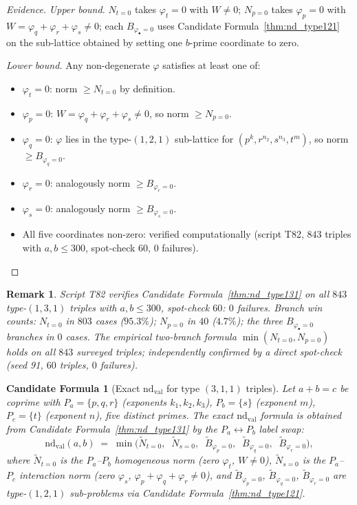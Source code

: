 \documentclass[12pt]{article}
\newtheorem{remark}{Remark}
\newtheorem{candidate}{Candidate Formula}
\theoremstyle{definition}
\begin{document}
\begin{proof}[Evidence]
  \textit{Upper bound.}  $N_{t=0}$ takes $\varphi_t=0$ with $W\ne 0$;
  $N_{p=0}$ takes $\varphi_p=0$ with $W=\varphi_q+\varphi_r+\varphi_s\ne 0$;
  each $B_{\varphi_\bullet=0}$ uses Candidate Formula~\ref{thm:nd_type121} on the sub-lattice
  obtained by setting one $b$-prime coordinate to zero.

  \textit{Lower bound.}
  Any non-degenerate $\varphi$ satisfies at least one of:
  \begin{itemize}
    \item $\varphi_t = 0$: norm $\ge N_{t=0}$ by definition.
    \item $\varphi_p = 0$: $W=\varphi_q+\varphi_r+\varphi_s\ne 0$,
      so norm $\ge N_{p=0}$.
    \item $\varphi_q = 0$: $\varphi$ lies in the type-$(1,2,1)$ sub-lattice for
      $(p^k, r^{n_2}, s^{n_3}, t^m)$, so norm $\ge B_{\varphi_q=0}$.
    \item $\varphi_r = 0$: analogously norm $\ge B_{\varphi_r=0}$.
    \item $\varphi_s = 0$: analogously norm $\ge B_{\varphi_s=0}$.
    \item All five coordinates non-zero: verified computationally (script T82,
      $843$ triples with $a, b \le 300$, spot-check $60$, $0$ failures).
  \end{itemize}
\end{proof}

\begin{remark}
  Script T82 verifies Candidate Formula~\ref{thm:nd_type131} on all $843$ type-$(1,3,1)$
  triples with $a, b \le 300$, spot-check $60$: $0$ failures.
  Branch win counts: $N_{t=0}$ in $803$ cases ($95.3\%$); $N_{p=0}$ in $40$
  ($4.7\%$); the three $B_{\varphi_\bullet=0}$ branches in $0$ cases.
  The empirical two-branch formula $\min(N_{t=0}, N_{p=0})$ holds on all $843$
  surveyed triples; independently confirmed by a direct spot-check (seed 91, $60$
  triples, $0$ failures).
\end{remark}

\begin{candidate}[Exact $\mathrm{nd}_{\mathrm{val}}$ for type $(3,1,1)$ triples]\label{cor:nd_type311}
  Let $a + b = c$ be coprime with $P_a = \{p, q, r\}$ (exponents $k_1, k_2, k_3$),
  $P_b = \{s\}$ (exponent $m$), $P_c = \{t\}$ (exponent $n$), five distinct primes.
  The exact $\mathrm{nd}_{\mathrm{val}}$ formula is obtained from Candidate Formula~\ref{thm:nd_type131} by
  the $P_a \leftrightarrow P_b$ label swap:
  \[
    \mathrm{nd}_{\mathrm{val}}(a,b) \;=\; \min\!\bigl(
      \tilde{N}_{t=0},\;\;
      \tilde{N}_{s=0},\;\;
      \tilde{B}_{\varphi_p=0},\;\;
      \tilde{B}_{\varphi_q=0},\;\;
      \tilde{B}_{\varphi_r=0}
    \bigr),
  \]
  where $\tilde{N}_{t=0}$ is the $P_a$--$P_b$ homogeneous norm (zero $\varphi_t$,
  $W\ne 0$), $\tilde{N}_{s=0}$ is the $P_a$--$P_c$ interaction norm
  (zero $\varphi_s$, $\varphi_p+\varphi_q+\varphi_r\ne 0$), and
  $\tilde{B}_{\varphi_p=0}$, $\tilde{B}_{\varphi_q=0}$, $\tilde{B}_{\varphi_r=0}$
  are type-$(1,2,1)$ sub-problems via Candidate Formula~\ref{thm:nd_type121}.
\end{candidate}
\end{document}
